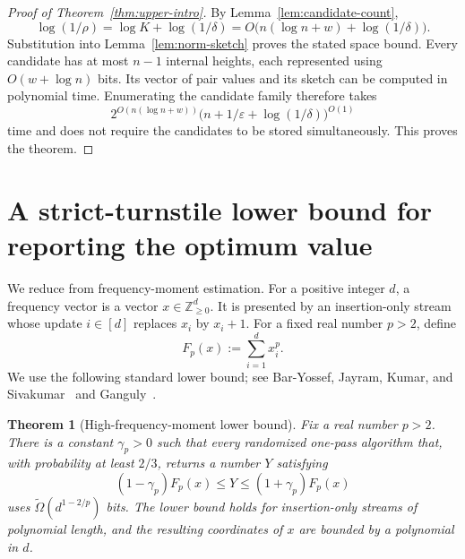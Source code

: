 \documentclass[11pt]{article}
\newtheorem{theorem}{Theorem}[section]
\theoremstyle{definition}
\newcommand{\Z}{\mathbb{Z}}
\newcommand{\Fp}{F_p}
\begin{document}
\begin{proof}[Proof of Theorem~\ref{thm:upper-intro}]
By Lemma~\ref{lem:candidate-count},
\[
 \log(1/\rho)=\log K+\log(1/\delta)
 =O\bigl(n(\log n+w)+\log(1/\delta)\bigr).
\]
Substitution into Lemma~\ref{lem:norm-sketch} proves the stated space bound.
Every candidate has at most \(n-1\) internal heights, each represented using
\(O(w+\log n)\) bits.  Its vector of pair values and its sketch can be
computed in polynomial time.  Enumerating the candidate family therefore
takes
\[
 2^{O(n(\log n+w))}
 \bigl(n+1/\varepsilon+\log(1/\delta)\bigr)^{O(1)}
\]
time and does not require the candidates to be stored simultaneously.  This
proves the theorem.
\end{proof}

\section{A strict-turnstile lower bound for reporting the optimum value}
\label{sec:lower}

We reduce from frequency-moment estimation.  For a positive integer \(d\), a
frequency vector is a vector \(x\in\Z_{\ge0}^d\).  It is presented by an
insertion-only stream whose update \(i\in[d]\) replaces \(x_i\) by
\(x_i+1\).  For a fixed real number \(p>2\), define
\[
 \Fp(x):=\sum_{i=1}^d x_i^p.
\]
We use the following standard lower bound; see Bar-Yossef, Jayram, Kumar, and
Sivakumar~\cite{BarYossefJayramKumarSivakumar2004} and
Ganguly~\cite{Ganguly2011}.

\begin{theorem}[High-frequency-moment lower bound]
\label{thm:fp-lower}
Fix a real number \(p>2\).  There is a constant \(\gamma_p>0\) such that every
randomized one-pass algorithm that, with probability at least \(2/3\), returns
a number \(Y\) satisfying
\[
 (1-\gamma_p)\Fp(x)\le Y\le(1+\gamma_p)\Fp(x)
\]
uses \(\widetilde\Omega(d^{1-2/p})\) bits.  The lower bound holds for
insertion-only streams of polynomial length, and the resulting coordinates
of \(x\) are bounded by a polynomial in \(d\).
\end{theorem}
\end{document}
